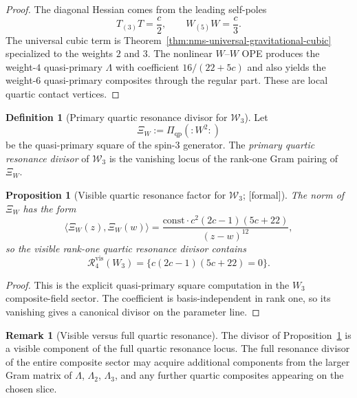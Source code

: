 \documentclass[11pt,oneside]{memoir}
\numberwithin{equation}{chapter}
\newtheorem{proposition}[theorem]{Proposition}
\theoremstyle{definition}
\newtheorem{definition}[theorem]{Definition}
\newtheorem{remark}[theorem]{Remark}
\newcommand{\ClaimStatusProvedHere}{\textnormal{[formal]}}
\begin{document}
\begin{proof}
The diagonal Hessian comes from the leading self-poles
\[
T_{(3)}T=\frac c2,
\qquad
W_{(5)}W=\frac c3.
\]
The universal cubic term is Theorem~\ref{thm:nms-universal-gravitational-cubic} specialized to the weights $2$ and $3$.  The nonlinear $W$--$W$ OPE produces the weight-$4$ quasi-primary $\Lambda$ with coefficient $16/(22+5c)$ and also yields the weight-$6$ quasi-primary composites through the regular part.  These are local quartic contact vertices.\qedhere
\end{proof}

\begin{definition}[Primary quartic resonance divisor for \texorpdfstring{$\mathcal W_3$}{W3}]
\label{def:nms-w3-primary-resonance}
Let
\[
\Xi_W:=\Pi_{\mathrm{qp}}(:W^2:)
\]
be the quasi-primary square of the spin-$3$ generator.  The \emph{primary quartic resonance divisor} of $\mathcal W_3$ is the vanishing locus of the rank-one Gram pairing of $\Xi_W$.
\end{definition}

\begin{proposition}[Visible quartic resonance factor for \texorpdfstring{$\mathcal W_3$}{W3}; \ClaimStatusProvedHere]
\label{prop:nms-w3-visible-resonance-factor}
The norm of $\Xi_W$ has the form
\[
\langle \Xi_W(z),\Xi_W(w)\rangle
=
\frac{\mathrm{const}\cdot c^2(2c-1)(5c+22)}{(z-w)^{12}},
\]
so the visible rank-one quartic resonance divisor contains
\[
\mathcal R^{\mathrm{vis}}_4(W_3)=\{c(2c-1)(5c+22)=0\}.
\]
\end{proposition}

\begin{proof}
This is the explicit quasi-primary square computation in the $W_3$ composite-field sector.  The coefficient is basis-independent in rank one, so its vanishing gives a canonical divisor on the parameter line.\qedhere
\end{proof}

\begin{remark}[Visible versus full quartic resonance]
\label{rem:nms-visible-vs-full-resonance}
The divisor of Proposition~\ref{prop:nms-w3-visible-resonance-factor} is a visible component of the full quartic resonance locus.  The full resonance divisor of the entire composite sector may acquire additional components from the larger Gram matrix of $\Lambda$, $\Lambda_2$, $\Lambda_3$, and any further quartic composites appearing on the chosen slice.
\end{remark}
\end{document}
